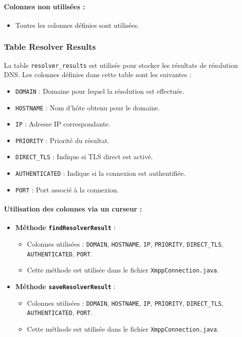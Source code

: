 \documentclass[a4paper,11pt]{article}
\begin{document}
\paragraph{Colonnes non utilisées :}
\begin{itemize}
    \item Toutes les colonnes définies sont utilisées.
\end{itemize}

\subsubsection*{Table Resolver Results}

La table \texttt{resolver\_results} est utilisée pour stocker les résultats de résolution DNS. Les colonnes définies dans cette table sont les suivantes :

\begin{itemize}
    \item \texttt{DOMAIN} : Domaine pour lequel la résolution est effectuée.
    \item \texttt{HOSTNAME} : Nom d'hôte obtenu pour le domaine.
    \item \texttt{IP} : Adresse IP correspondante.
    \item \texttt{PRIORITY} : Priorité du résultat.
    \item \texttt{DIRECT\_TLS} : Indique si TLS direct est activé.
    \item \texttt{AUTHENTICATED} : Indique si la connexion est authentifiée.
    \item \texttt{PORT} : Port associé à la connexion.
\end{itemize}

\paragraph{Utilisation des colonnes via un curseur :}
\begin{itemize}
    \item \textbf{Méthode \texttt{findResolverResult}} :
    \begin{itemize}
        \item Colonnes utilisées : \texttt{DOMAIN}, \texttt{HOSTNAME}, \texttt{IP}, \texttt{PRIORITY}, \texttt{DIRECT\_TLS}, \texttt{AUTHENTICATED}, \texttt{PORT}.
        \item Cette méthode est utilisée dans le fichier \texttt{XmppConnection.java}.
    \end{itemize}
    \item \textbf{Méthode \texttt{saveResolverResult}} :
    \begin{itemize}
        \item Colonnes utilisées : \texttt{DOMAIN}, \texttt{HOSTNAME}, \texttt{IP}, \texttt{PRIORITY}, \texttt{DIRECT\_TLS}, \texttt{AUTHENTICATED}, \texttt{PORT}.
        \item Cette méthode est utilisée dans le fichier \texttt{XmppConnection.java}.
    \end{itemize}
\end{itemize}
\end{document}

